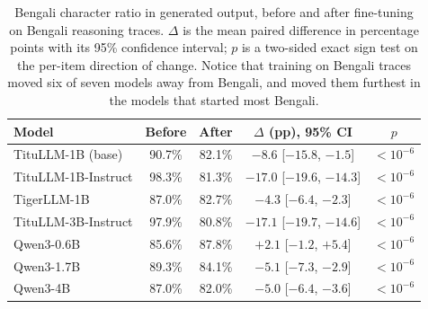 \begin{table}[t]
\caption{Bengali character ratio in generated output, before and after
fine-tuning on Bengali reasoning traces. $\Delta$ is the mean paired
difference in percentage points with its 95\% confidence interval; $p$ is
a two-sided exact sign test on the per-item direction of change. Notice
that training on Bengali traces moved six of seven models away from
Bengali, and moved them furthest in the models that started most Bengali.}
\label{tab:adherence}
\centering\small
\begin{tabular}{|l|c|c|c|c|}
\hline
\textbf{Model} & \textbf{Before} & \textbf{After} & \textbf{$\Delta$ (pp), 95\% CI} & \textbf{$p$} \\
\hline
TituLLM-1B (base) & 90.7\% & 82.1\% & $-8.6$ [$-15.8$, $-1.5$] & $<10^{-6}$ \\
TituLLM-1B-Instruct & 98.3\% & 81.3\% & $-17.0$ [$-19.6$, $-14.3$] & $<10^{-6}$ \\
TigerLLM-1B & 87.0\% & 82.7\% & $-4.3$ [$-6.4$, $-2.3$] & $<10^{-6}$ \\
TituLLM-3B-Instruct & 97.9\% & 80.8\% & $-17.1$ [$-19.7$, $-14.6$] & $<10^{-6}$ \\
Qwen3-0.6B & 85.6\% & 87.8\% & $+2.1$ [$-1.2$, $+5.4$] & $<10^{-6}$ \\
Qwen3-1.7B & 89.3\% & 84.1\% & $-5.1$ [$-7.3$, $-2.9$] & $<10^{-6}$ \\
Qwen3-4B & 87.0\% & 82.0\% & $-5.0$ [$-6.4$, $-3.6$] & $<10^{-6}$ \\
\hline
\end{tabular}
\end{table}